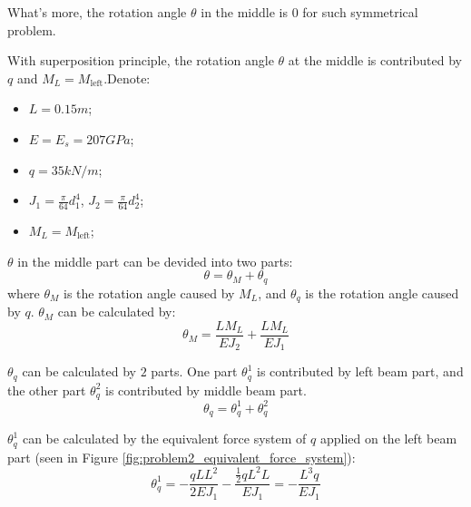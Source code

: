 What's more, the rotation angle $\theta$ in the middle 
is $0$ for such symmetrical problem.

With superposition principle, 
the rotation angle $\theta$ at the middle is contributed by $q$ and 
$M_{L} = M_{\text{left}}$.Denote:
\begin{itemize}
    \item $L=0.15m$;
    \item $E=E_s=207GPa$;
    \item $q=35kN/m$;
    \item $J_1=\frac{\pi}{64}d_1^4$, $J_2=\frac{\pi}{64}d_2^4$;
    \item $M_L = M_{\text{left}}$;
\end{itemize}

$\theta$ in the middle part can be devided into two parts:
\begin{equation}
    \theta = \theta_M + \theta_q
\end{equation}
where $\theta_M$ is the rotation angle caused by $M_L$, and $\theta_q$ is the rotation angle caused by $q$.
$\theta_M$ can be calculated by:
\begin{equation}
    \theta_M = \frac{L M_{L}}{E J_{2}} + \frac{L M_{L}}{E J_{1}}
\end{equation}

$\theta_q$ can be calculated by $2$ parts.
One part $\theta_q^1$ is contributed by left beam part, 
and the other part $\theta_q^2$ is contributed by middle beam part.
\begin{equation}
    \theta_q = \theta_q^1 + \theta_q^2
\end{equation}

$\theta_q^1$ can be calculated by the equivalent force system of $q$ applied on the left beam part (seen in 
Figure \ref{fig:problem2_equivalent_force_system}):
\begin{equation}
    \theta_q^1 = -\frac{q L L^2}{2 E J_{1}}
    - \frac{\frac{1}{2}qL^2 L}{E J_{1}}=
    - \frac{L^{3} q}{E J_{1}}
\end{equation}


